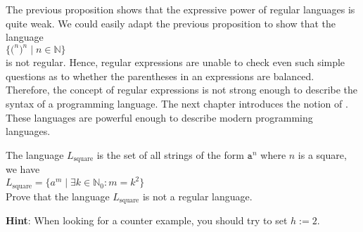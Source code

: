 \remark
The previous proposition shows that the expressive power of regular languages is quite weak.
We could easily adapt the previous proposition to show that the language
\\[0.2cm]
\hspace*{1.3cm}
$\bigl\{ \mathtt{(}^n \mathtt{)}^n \mid n \in \mathbb{N} \bigr\}$
\\[0.2cm]
is not regular.  Hence, regular expressions are unable to check even such simple questions as to
whether the parentheses in an expressions are balanced.  Therefore, the concept of regular
expressions is not strong enough to describe the syntax of a programming language.
The next chapter introduces the notion of .  These languages
are powerful enough to describe modern programming languages. 

\exerciseEng
The language  $L_{\mathrm{square}}$ is the set of all strings of the form $\mathtt{a}^n$ where $n$
is a square, we have
\\[0.2cm]
\hspace*{1.3cm}
$L_{\mathrm{square}} = \bigl\{ a^{m} \mid \exists k \in \mathbb{N}_0: m = k^2 \bigr\}$
\\[0.2cm]
Prove that the language  $L_{\mathrm{square}}$ is not a regular language.
\eox
\vspace*{0.1cm}

\noindent
\textbf{Hint}:  When looking for a counter example, you should try to set $h:=2$.


